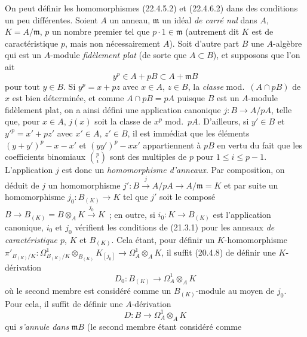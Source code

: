 \begin{remark}[22.4.8]
\label{0.22.4.8-fr}
On peut définir les homomorphismes (22.4.5.2) et (22.4.6.2) dans des conditions
un peu différentes. Soient $A$ un anneau, $\mathfrak m$ un idéal \emph{de carré
nul} dans $A$, $K=A/\mathfrak m$, $p$ un nombre premier tel que
$p\cdot1\in\mathfrak m$ (autrement dit $K$ est de caractéristique $p$, mais non
nécessairement $A$). Soit d'autre part $B$ une $A$-algèbre qui est un $A$-module
\emph{fidèlement plat} (de sorte que $A\subset B$), et supposons que l'on ait
\begin{equation}
\label{0.22.4.8.1-fr}
  y^p\in A+pB\subset A+\mathfrak mB
  \tag{22.4.8.1}
\end{equation}
pour tout $y\in B$. Si $y^p=x+pz$ avec $x\in A$, $z\in B$, la \emph{classe}
mod.~$(A\cap pB)$ de $x$ est bien déterminée, et comme $A\cap pB=pA$ puisque
$B$ est un $A$-module fidèlement plat, on a ainsi défini une application
canonique $j:B\longrightarrow A/pA$, telle que, pour $x\in A$, $j(x)$ soit la
classe de $x^p$ mod.~$pA$. D'ailleurs, si $y'\in B$ et
$y'^p=x'+pz'$ avec $x'\in A$, $z'\in B$, il est immédiat que les éléments
$(y+y')^p-x-x'$ et $(yy')^p-xx'$ appartiennent à $pB$ en vertu du fait que les
coefficients binomiaux $\binom pi$ sont des multiples de $p$ pour
$1\leqslant i\leqslant p-1$. L'application $j$ est donc un
\emph{homomorphisme d'anneaux}. Par composition, on déduit de $j$ un
homomorphisme $j':B\xrightarrow{j}A/pA\longrightarrow A/\mathfrak m=K$ et par
suite un homomorphisme $j_0:B_{(K)}\longrightarrow K$ tel que $j'$ soit le
composé $B\longrightarrow B_{(K)}=B\otimes_AK\xrightarrow{j_0}K$~; en outre,
si $i_0:K\longrightarrow B_{(K)}$ est l'application canonique, $i_0$ et $j_0$
vérifient les conditions de (21.3.1) pour les anneaux \emph{de caractéristique
$p$}, $K$ et $B_{(K)}$. Cela étant, pour définir un $K$-homomorphisme
$\pi'_{B_{(K)}/K}:\Omega^1_{B_{(K)}/K}\otimes_{B_{(K)}}K_{[j_0]}
\longrightarrow\Omega^1_A\otimes_AK$, il suffit (20.4.8) de définir une
$K$-dérivation
\begin{equation}
\label{0.22.4.8.2-fr}
  D_0:B_{(K)}\longrightarrow\Omega^1_A\otimes_AK
  \tag{22.4.8.2}
\end{equation}
où le second membre est considéré comme un $B_{(K)}$-module au moyen de $j_0$.
Pour cela, il suffit de définir une $A$-dérivation
\begin{equation}
\label{0.22.4.8.3-fr}
  D:B\longrightarrow\Omega^1_A\otimes_AK
  \tag{22.4.8.3}
\end{equation}
qui \emph{s'annule dans} $\mathfrak mB$ (le second membre étant considéré comme

\end{remark}
